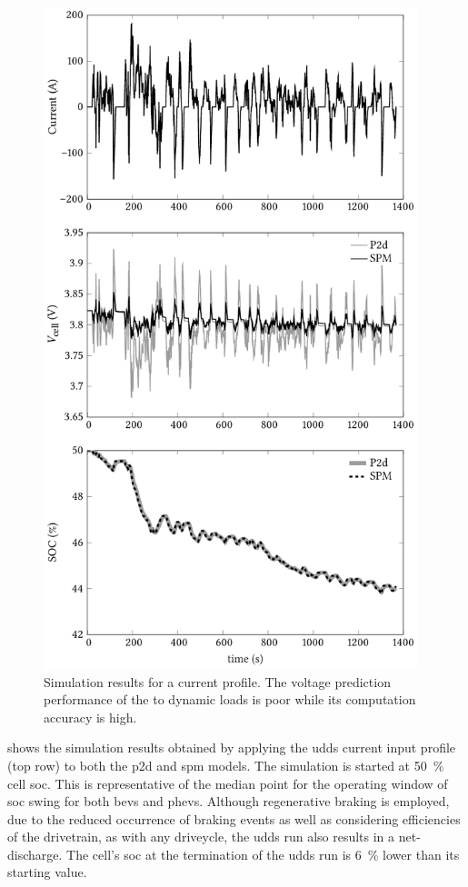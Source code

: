 \begin{figure}[!htb]
    \centering
    \includegraphics[width=10.890625cm]{4/figures/udds_I_v_soc.pdf} %
    \caption[Simulation results of  and 
    models to  current profile]{Simulation results for a
         current profile. The voltage prediction performance
        of the  to dynamic loads is poor while its
     computation accuracy is high.}
    \label{fig:uddssimp2dspmresults}
\end{figure}

  shows   the  simulation  results   obtained  by
applying the  \gls{udds} current input profile  (top row) to both  the \gls{p2d}
and  \gls{spm}  models. The  simulation  is  started at  \SI{50}{\percent}  cell
\gls{soc}. This is  representative of the median point for  the operating window
of \gls{soc} swing for both  \glspl{bev} and \glspl{phev}. Although regenerative
braking is  employed, due to  the reduced occurrence  of braking events  as well
as  considering efficiencies  of  the  drivetrain, as  with  any driveycle,  the
\gls{udds} run  also results  in a  net-discharge. The  cell's \gls{soc}  at the
termination of  the \gls{udds}  run is \approx  \SI{6}{\percent} lower  than its
starting value.

